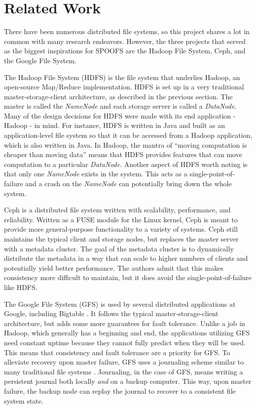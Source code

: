 \section{Related Work}
\label{sec:related_work}

There have been numerous distributed file systems, so this project shares a lot in common with many research endeavors.  However, the three projects that served as the biggest inspirations for SPOOFS are the Hadoop File System, Ceph, and the Google File System.

The Hadoop File System (HDFS) \cite{borthakur_hdfs09} is the file system that underlies Hadoop, an open-source Map/Reduce implementation.  HDFS is set up in a very traditional master-storage-client architecture, as described in the previous section.  The master is called the \textit{NameNode} and each storage server is called a \textit{DataNode}.  Many of the design decisions for HDFS were made with its end application - Hadoop - in mind.  For instance, HDFS is written in Java and built as an application-level file system so that it can be accessed from a Hadoop application, which is also written in Java.  In Hadoop, the mantra of ``moving computation is cheaper than moving data'' means that HDFS provides features that can move computation to a particular \textit{DataNode}.  Another aspect of HDFS worth noting is that only one \textit{NameNode} exists in the system.  This acts as a single-point-of-failure and a crash on the \textit{NameNode} can potentially bring down the whole system.

Ceph \cite{weil_osdi06} is a distributed file system written with scalability, performance, and reliability.  Written as a FUSE module for the Linux kernel, Ceph is meant to provide more general-purpose functionality to a variety of systems.  Ceph still maintains the typical client and storage nodes, but replaces the master server with a metadata cluster.  The goal of the metadata cluster is to dynamically distribute the metadata in a way that can scale to higher numbers of clients and potentially yield better performance.  The authors admit that this makes consistency more difficult to maintain, but it does avoid the single-point-of-failure like HDFS.

The Google File System (GFS) \cite{ghemawat_sigops03} is used by several distributed applications at Google, including Bigtable \cite{chang_osdi06}.  It follows the typical master-storage-client architecture, but adds some more guarantees for fault tolerance.  Unlike a job in Hadoop, which generally has a beginning and end, the applications utilizing GFS need constant uptime because they cannot fully predict when they will be used.  This means that consistency and fault tolerance are a priority for GFS.  To alleviate recovery upon master failure, GFS uses a journaling scheme similar to many traditional file systems \cite{seltzer_atc00}.  Journaling, in the case of GFS, means writing a persistent journal both locally \textit{and} on a backup computer.  This way, upon master failure, the backup node can replay the journal to recover to a consistent file system state.

